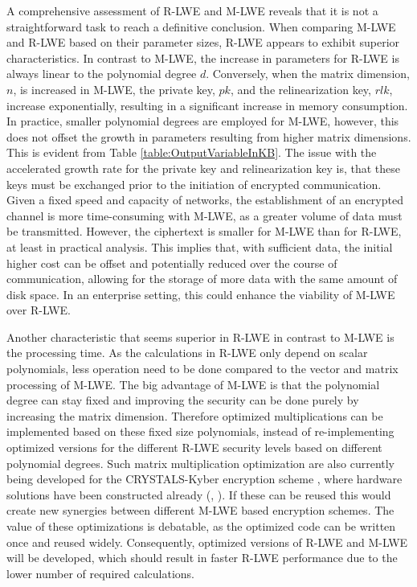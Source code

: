 A comprehensive assessment of R-LWE and M-LWE reveals that it is not a straightforward task to reach a definitive conclusion. When comparing M-LWE and R-LWE based on their parameter sizes, R-LWE appears to exhibit superior characteristics. In contrast to M-LWE, the increase in parameters for R-LWE is always linear to the polynomial degree $d$. Conversely, when the matrix dimension, $n$, is increased in M-LWE, the private key, $pk$, and the relinearization key, $rlk$, increase exponentially, resulting in a significant increase in memory consumption. 
In practice, smaller polynomial degrees are employed for M-LWE, however, this does not offset the growth in parameters resulting from higher matrix dimensions. This is evident from Table \ref{table:OutputVariableInKB}. The issue with the accelerated growth rate for the private key and relinearization key is, that these keys must be exchanged prior to the initiation of encrypted communication. Given a fixed speed and capacity of networks, the establishment of an encrypted channel is more time-consuming with M-LWE, as a greater volume of data must be transmitted. However, the ciphertext is smaller for M-LWE than for R-LWE, at least in practical analysis. This implies that, with sufficient data, the initial higher cost can be offset and potentially reduced over the course of communication, allowing for the storage of more data with the same amount of disk space. In an enterprise setting, this could enhance the viability of M-LWE over R-LWE. 

Another characteristic that seems superior in R-LWE in contrast to M-LWE is the processing time. As the calculations in R-LWE only depend on scalar polynomials, less operation need to be done compared to the vector and matrix processing of M-LWE. The big advantage of M-LWE is that the polynomial degree can stay fixed and improving the security can be done purely by increasing the matrix dimension. Therefore optimized multiplications can be implemented based on these fixed size polynomials, instead of re-implementing optimized versions for the different R-LWE security levels based on different polynomial degrees. Such matrix multiplication optimization are also currently being developed for the CRYSTALS-Kyber encryption scheme \cite{CyrstalsKyber}, where hardware solutions have been constructed already (\cite{KyberHardware}, \cite{KyberHardware2}). If these can be reused this would create new synergies between different M-LWE based encryption schemes. The value of these optimizations is debatable, as the optimized code can be written once and reused widely. Consequently, optimized versions of R-LWE and M-LWE will be developed, which should result in faster R-LWE performance due to the lower number of required calculations.

